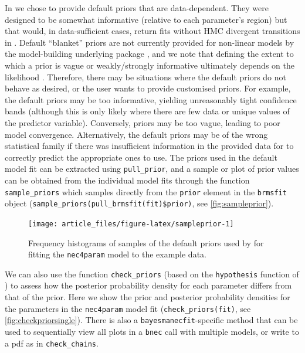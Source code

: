 \documentclass[
  shortnames]{jss}
\begin{document}
In  we chose to provide default priors that are data-dependent. They were designed to be somewhat informative (relative to each parameter's region) but that would, in data-sufficient cases, return fits without HMC divergent transitions in . Default ``blanket'' priors are not currently provided for non-linear models by the model-building underlying package , and we note that defining the extent to which a prior is vague or weakly/strongly informative ultimately depends on the likelihood \citep{gelman2017entropy}. Therefore, there may be situations where the default  priors do not behave as desired, or the user wants to provide customised priors. For example, the default priors may be too informative, yielding unreasonably tight confidence bands (although this is only likely where there are few data or unique values of the predictor variable). Conversely, priors may be too vague, leading to poor model convergence. Alternatively, the default priors may be of the wrong statistical family if there was insufficient information in the provided data for  to correctly predict the appropriate ones to use. The priors used in the default model fit can be extracted using \texttt{pull\_prior}, and a sample or plot of prior values can be obtained from the individual  model fits through the function \texttt{sample\_priors} which samples directly from the \texttt{prior} element in the \texttt{brmsfit} object (\texttt{sample\_priors(pull\_brmsfit(fit)\$prior)}, see \autoref{fig:sampleprior}).

\begin{CodeChunk}
\begin{figure}[!ht]

{\centering \texttt{[image: article\_files/figure-latex/sampleprior-1]} 

}

\caption[Frequency histograms of samples of the default priors used by  for fitting the \texttt{nec4param} model to the example data]{Frequency histograms of samples of the default priors used by  for fitting the \texttt{nec4param} model to the example data.}\label{fig:sampleprior}
\end{figure}
\end{CodeChunk}

We can also use the function \texttt{check\_priors} (based on the \texttt{hypothesis} function of ) to assess how the posterior probability density for each parameter differs from that of the prior. Here we show the prior and posterior probability densities for the parameters in the \texttt{nec4param} model fit (\texttt{check\_priors(fit)}, see \autoref{fig:checkpriorsingle}). There is also a \texttt{bayesmanecfit}-specific method that can be used to sequentially view all plots in a \texttt{bnec} call with multiple models, or write to a pdf as in \texttt{check\_chains}.
\end{document}
